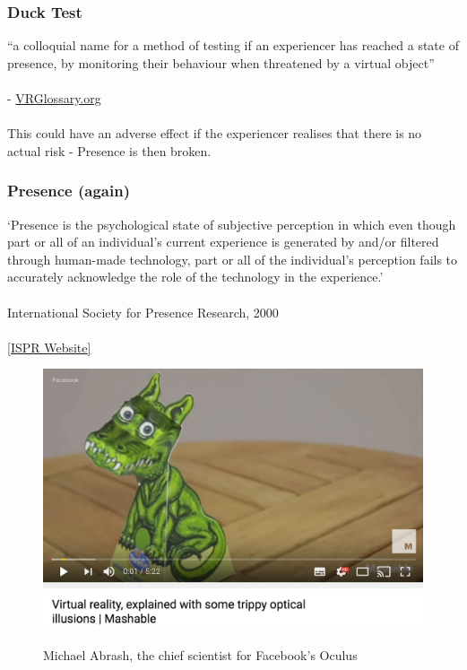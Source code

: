 \begin{frame}
	\frametitle{Duck Test}
	``a colloquial name for a method of testing if an experiencer has reached a state of presence, by monitoring their behaviour when threatened by a virtual object'' \\~\\
	- \href{http://www.vrglossary.org/glossary/duck-test/}{VRGlossary.org} \\~\\
	This could have an adverse effect if the experiencer realises that there is no actual risk - Presence is then broken.
		
\end{frame}


\begin{frame}
	\frametitle{Presence (again)}
	
	`Presence is the psychological state of subjective perception in which even though part or all of an individual's current experience is generated by and/or filtered through human-made technology, part or all of the individual's perception fails to accurately acknowledge the role of the technology in the experience.' \\~\\
	
	International Society for Presence Research, 2000
	\\~\\
	\href{http://ispr.info}{[ISPR Website]}	
	
\end{frame}


\begin{frame}
	\begin{figure}
		\href{https://www.youtube.com/watch?v=qD3w3cAhEYU}{ \includegraphics[scale=.4]{assets/optical}  }
		\caption{Michael Abrash, the chief scientist for Facebook's Oculus}
	\end{figure}
\end{frame}

